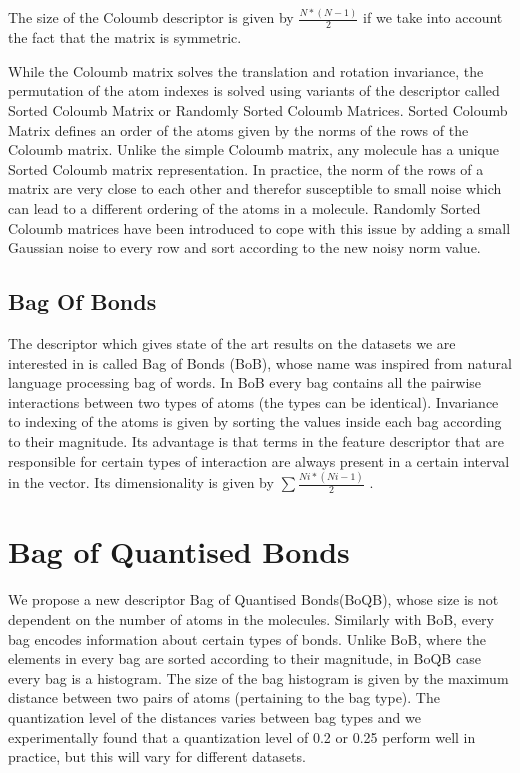 \documentclass{article}
\begin{document}
The size of the Coloumb descriptor is given by $\frac{N*(N - 1)}{2}$ if we take into account the fact that the matrix is symmetric.

While the Coloumb matrix solves the translation and rotation invariance, the permutation of the atom indexes is solved using variants of the descriptor called Sorted Coloumb Matrix or Randomly Sorted Coloumb Matrices.  Sorted Coloumb Matrix defines an order of the atoms given by the norms of the rows of the Coloumb matrix. Unlike the simple Coloumb matrix, any molecule has a unique Sorted Coloumb matrix representation.
In practice,  the norm of the rows of a matrix are very close to each other and therefor susceptible to small noise which can lead to a different ordering of the atoms in a molecule. Randomly Sorted Coloumb matrices have been introduced to cope with this issue by adding a small Gaussian noise to every row and sort according to the new noisy norm value.

\subsection{Bag Of Bonds}
The descriptor which gives state of the art results on the datasets we are interested in is called Bag of Bonds (BoB), whose name was inspired from natural language processing bag of words. In BoB every bag contains all the pairwise interactions between two types of atoms (the types can be identical). Invariance to indexing of the atoms is given by sorting the values inside each bag according to their magnitude.
Its advantage is that terms in the feature descriptor that are responsible for certain types 
of interaction are always present in a certain interval in the vector.
Its dimensionality  is given by $\sum \frac{Ni*(Ni-1)}{2}$ .


\section{Bag of Quantised Bonds}
We propose a new descriptor Bag of Quantised Bonds(BoQB), whose size is not dependent on the number of atoms in the molecules. Similarly with BoB, every bag  encodes information about certain types of bonds. Unlike BoB, where the elements in every bag are sorted according to their magnitude, in BoQB case every bag is a histogram. The size of  the bag histogram is given by the maximum distance between two pairs of atoms (pertaining to the bag type). The quantization level of the distances varies between bag types and we experimentally found that a quantization level of 0.2 or 0.25 perform well in practice, but this will vary for different datasets.
\end{document}
